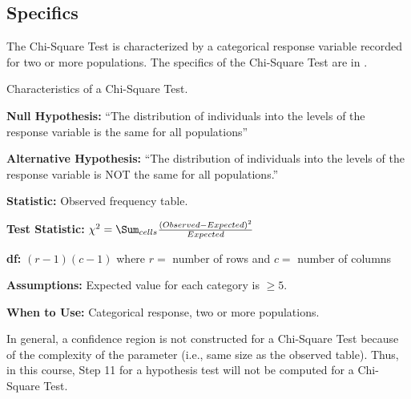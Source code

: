 \documentclass[10pt,openany]{book}\usepackage[]{graphicx}\usepackage[]{color}
\begin{document}
\subsection{Specifics}
\vspace{-3pt}
The Chi-Square Test is characterized by a categorical response variable recorded for two or more populations. The specifics of the Chi-Square Test are in .

\begin{table}[h]
\centering
\colorbox{ltgray}{
\begin{minipage}{.8\textwidth}
  \centering
	\caption{Characteristics of a Chi-Square Test.}\label{tab:Chispec}
\vspace{-3pt}
  \begin{Itemize}
      \item \textbf{Null Hypothesis:} ``The distribution of individuals into the levels of the response variable is the same for all populations''
      \item \textbf{Alternative Hypothesis:} ``The distribution of individuals into the levels of the response variable is NOT the same for all populations.''
      \item \textbf{Statistic:} Observed frequency table.
      \item \textbf{Test Statistic:} $\chi^{2} = \Sum_{cells}\frac{(Observed-Expected)^{2}}{Expected}$
      \item \textbf{df:} $(r-1)(c-1)$ where $r=$ number of rows and $c=$ number of columns
      \item \textbf{Assumptions:} Expected value for each category is $\geq5$.
      \item \textbf{When to Use:} Categorical response, two or more populations.
  \end{Itemize}
\end{minipage}}
\end{table}

In general, a confidence region is not constructed for a Chi-Square Test because of the complexity of the parameter (i.e., same size as the observed table). Thus, in this course, Step 11 for a hypothesis test will not be computed for a Chi-Square Test.

\vspace{-3pt}
\end{document}
